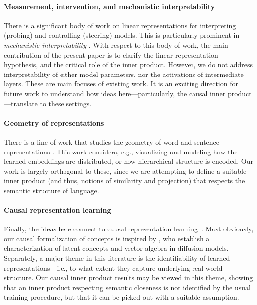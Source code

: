 \documentclass{article}
\theoremstyle{plain}
\theoremstyle{definition}
\theoremstyle{remark}
\begin{document}
\paragraph{Measurement, intervention, and mechanistic interpretability}
There is a significant body of work on linear representations for interpreting (probing) \citep[e.g.,][]{alain2017understanding, kim2018interpretability,nostalgebraist2020logitlens,rogers2021primer, belinkov2022probing, li2022emergent, geva2022transformer, nanda2023emergent}
and controlling (steering) \citep[e.g.,][]{wang2023concept,ActivationAddition:2023,merullo2023language,trager2023linear} models. This is particularly prominent in \emph{mechanistic interpretability} \citep{elhage2021mathematical,meng2022locating,hernandez2023linearity,ActivationAddition:2023,zou2023representation,todd2023function,hendel2023incontext}. 
With respect to this body of work, the main contribution of the present paper is to clarify the linear representation hypothesis, and the critical role of the inner product. 
However, we do not address interpretability of either model parameters, nor the activations of intermediate layers. These are main focuses of existing work. It is an exciting direction for future work to understand how ideas here---particularly, the causal inner product---translate to these settings.


\paragraph{Geometry of representations}
There is a line of work that studies the geometry of word and sentence representations \citep[e.g.,][]{arora2016latent,mimno2017strange,ethayarajh2019contextual,reif2019visualizing,li2020sentence,hewitt2019structural,chen2021probing, chang2022geometry, jiang2023uncovering}.
This work considers, e.g., visualizing and modeling how the learned embeddings are distributed, or how hierarchical structure is encoded.
Our work is largely orthogonal to these, since we are attempting to define a suitable inner product (and thus, notions of similarity and projection) that respects the semantic structure of language.


\paragraph{Causal representation learning}
Finally, the ideas here connect to causal representation learning~\citep[e.g.,][]{higgins2016beta,hyvarinen2016unsupervised,higgins2018towards,khemakhem2020variational,zimmermann2021contrastive,scholkopf2021toward,MoranDeepGenIdent:2021,wang2023concept}.
Most obviously, our causal formalization of concepts is inspired by \citet{wang2023concept}, who establish a characterization of latent concepts and vector algebra in diffusion models.
Separately, a major theme in this literature is the identifiability of learned representations---i.e., to what extent they capture underlying real-world structure.
Our causal inner product results may be viewed in this theme, showing that an inner product respecting semantic closeness is not identified by the usual training procedure, but that it can be picked out with a suitable assumption.  
\end{document}
